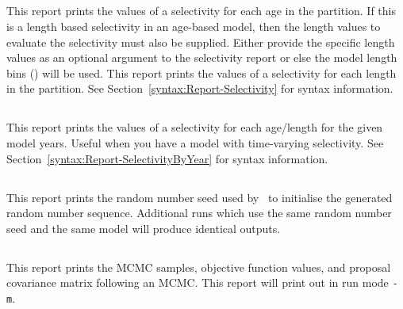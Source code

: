 \subsection{}\label{sec:Report-Selectivity}

\ifAgeBased
This report prints the values of a selectivity for each age in the partition. If this is a length based selectivity in an age-based model, then the length values to evaluate the selectivity must also be supplied. Either provide the specific length values as an optional argument to the selectivity report or else the model length bins () will be used.
\else
This report prints the values of a selectivity for each length in the partition.
\fi
See Section~\ref{syntax:Report-Selectivity} for syntax information.

\subsection{}\label{sec:Report-SelectivityByYear}

This report prints the values of a selectivity for each age/length for the given model years. Useful when you have a model with time-varying selectivity. See Section~\ref{syntax:Report-SelectivityByYear} for syntax information.

\subsection{}\label{sec:Report-RandomNumberSeed}

This report prints the random number seed used by \CNAME\ to initialise the generated random number sequence. Additional runs which use the same random number seed and the same model will produce identical outputs.

\subsection{}\label{sec:Report-MCMC}

This report prints the MCMC samples, objective function values, and proposal covariance matrix following an MCMC. This report will print out in run mode \texttt{-m}.

\subsection{}\label{sec:Report-MCMCSample}

